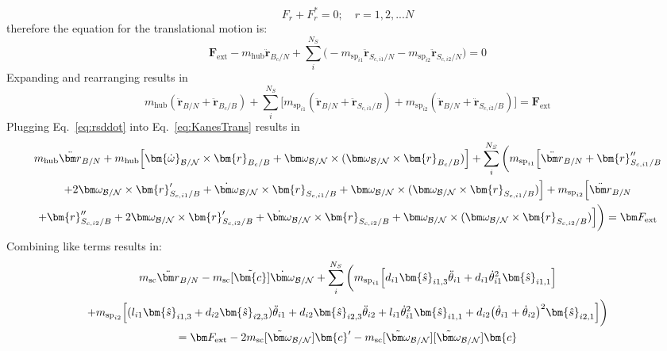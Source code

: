 \begin{equation}
	F_r + F^*_r = 0;\quad r = 1, 2, ... N
	\label{eq:KanesEq}
\end{equation}
therefore the equation for the translational motion is:
\begin{equation}
	\bm F_{\text{ext}} -m_{\text{hub}} \ddot{\bm r}_{B_c/N} + \sum\limits_{i}^{N_S} \Big( -m_{\text{sp}_{i1}} \ddot{\bm{r}}_{S_{c,{i1}}/N} -m_{\text{sp}_{i2}} \ddot{\bm{r}}_{S_{c,{i2}}/N}\Big) = 0
\end{equation}
Expanding and rearranging results in
\begin{equation}
	m_{\text{hub}} (\ddot{\bm r}_{B/N} + \ddot{\bm r}_{B_c/B})  + \sum\limits_{i}^{N_S} \Big[ m_{\text{sp}_{i1}} (\ddot{\bm r}_{B/N} + \ddot{\bm{r}}_{S_{c,{i1}}/B}) + m_{\text{sp}_{i2}} (\ddot{\bm r}_{B/N} + \ddot{\bm{r}}_{S_{c,{i2}}/B})\Big] = \bm F_{\text{ext}}
	\label{eq:KanesTrans}
\end{equation}
Plugging Eq.~\eqref{eq:rsddot} into Eq.~\eqref{eq:KanesTrans} results in
\begin{multline}
	m_{\text{hub}} \ddot{\bm r}_{B/N} + m_{\text{hub}}\Big[\bm{\dot{\omega}}_{\cal B/N} \times \bm{r}_{B_c/B} + \bm\omega_{\cal B/N} \times (\bm\omega_{\cal B/N} \times \bm{r}_{B_c/B})\Big]
	+ \sum\limits_{i}^{N_S} \bigg( m_{\text{sp}_{i1}} \Big[\ddot{\bm r}_{B/N} + \bm{r}''_{S_{c,i1}/B} \\
	+ 2 \bm\omega_{\cal B/N} \times \bm{r}'_{S_{c,i1}/B} +  \dot{\bm\omega}_{\cal B/N} \times \bm{r}_{S_{c,i1}/B} + \bm\omega_{\cal B/N} \times (\bm\omega_{\cal B/N} \times \bm{r}_{S_{c,i1}/B})\Big]
	+ m_{\text{sp}_{i2}} \Big[\ddot{\bm r}_{B/N} \\
	+ \bm{r}''_{S_{c,i2}/B} + 2 \bm\omega_{\cal B/N} \times \bm{r}'_{S_{c,i2}/B} +  \dot{\bm\omega}_{\cal B/N} \times \bm{r}_{S_{c,i2}/B} + \bm\omega_{\cal B/N} \times (\bm\omega_{\cal B/N} \times \bm{r}_{S_{c,i2}/B})\Big]\bigg) = \bm F_{\text{ext}}
\end{multline}
Combining like terms results in:
\begin{multline}
	m_{\text{sc}} \ddot{\bm r}_{B/N} -m_{\textnormal{sc}} [\tilde{\bm{c}}]\dot{\bm\omega}_{\cal B/N}
	+ \sum\limits_{i}^{N_S} \bigg( m_{\text{sp}_{i1}} \Big[d_{i1} \bm{\hat{s}}_{i1,3} \ddot{\theta}_{i1} + d_{i1} \dot{\theta}_{i1}^2 \bm{\hat{s}}_{i1,1}\Big] \\
	+ m_{\text{sp}_{i2}} \Big[(l_{i1} \bm{\hat{s}}_{i1,3} + d_{i2} \bm{\hat{s}}_{i2,3}) \ddot{\theta}_{i1} + d_{i2} \bm{\hat{s}}_{i2,3} \ddot{\theta}_{i2} + l_{i1} \dot{\theta}_{i1}^2 \bm{\hat{s}}_{i1,1} + d_{i2}\big(\dot{\theta}_{i1} + \dot{\theta}_{i2}\big)^2\bm{\hat{s}}_{i2,1} \Big]\bigg) \\
	= \bm F_{\text{ext}} - 2 m_{\textnormal{sc}}[\tilde{\bm\omega}_{\cal B/N}]\bm{c}' - m_{\textnormal{sc}} [\tilde{\bm\omega}_{\cal B/N}][\tilde{\bm\omega}_{\cal B/N}]\bm{c}
\end{multline}
